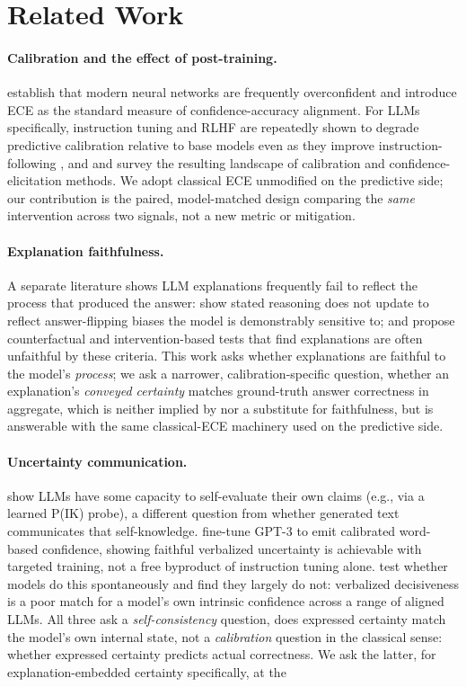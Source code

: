 \documentclass[letterpaper]{article} %
\begin{document}
\section{Related Work} \paragraph{Calibration and the effect of post-training.} \citet{guo2017calibration} establish that modern neural networks are frequently overconfident and introduce ECE as the standard measure of confidence-accuracy alignment. For LLMs specifically, instruction tuning and RLHF are repeatedly shown to degrade predictive calibration relative to base models even as they improve instruction-following \citep{desai2020calibration,zhu2023calibration,tian2023justask,leng2025taming}, and \citet{geng2024survey} and \citet{xiong2024llms} survey the resulting landscape of calibration and confidence-elicitation methods. We adopt classical ECE unmodified on the predictive side; our contribution is the paired, model-matched design comparing the \emph{same} intervention across two signals, not a new metric or mitigation. \paragraph{Explanation faithfulness.} A separate literature shows LLM explanations frequently fail to reflect the process that produced the answer: \citet{turpin2023language} show stated reasoning does not update to reflect answer-flipping biases the model is demonstrably sensitive to; \citet{atanasova2023faithfulness} and \citet{lanham2023measuring} propose counterfactual and intervention-based tests that find explanations are often unfaithful by these criteria. This work asks whether explanations are faithful to the model's \emph{process}; we ask a narrower, calibration-specific question, whether an explanation's \emph{conveyed certainty} matches ground-truth answer correctness in aggregate, which is neither implied by nor a substitute for faithfulness, but is answerable with the same classical-ECE machinery used on the predictive side. \paragraph{Uncertainty communication.} \citet{kadavath2022language} show LLMs have some capacity to self-evaluate their own claims (e.g., via a learned P(IK) probe), a different question from whether generated text communicates that self-knowledge. \citet{lin2022teaching} fine-tune GPT-3 to emit calibrated word-based confidence, showing faithful verbalized uncertainty is achievable with targeted training, not a free byproduct of instruction tuning alone. \citet{yona2024llms} test whether models do this spontaneously and find they largely do not: verbalized decisiveness is a poor match for a model's own intrinsic confidence across a range of aligned LLMs. All three ask a \emph{self-consistency} question, does expressed certainty match the model's own internal state, not a \emph{calibration} question in the classical \citet{guo2017calibration} sense: whether expressed certainty predicts actual correctness. We ask the latter, for explanation-embedded certainty specifically, at the 
\end{document}
